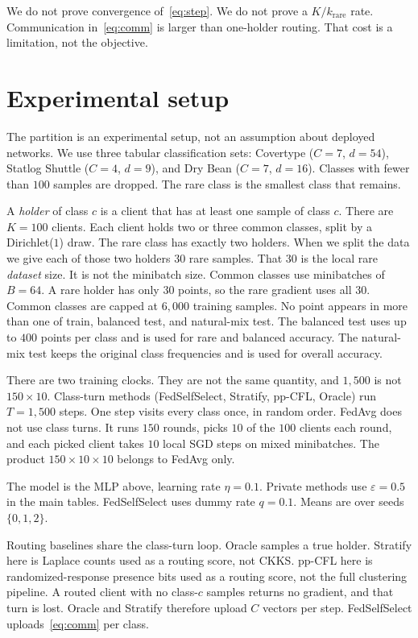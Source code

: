 \documentclass[11pt,a4paper]{article}
\theoremstyle{plain}
\begin{document}
We do not prove convergence of~\eqref{eq:step}. We do not prove a $K/k_{\mathrm{rare}}$ rate. Communication in~\eqref{eq:comm} is larger than one-holder routing. That cost is a limitation, not the objective.

\section{Experimental setup}

The partition is an experimental setup, not an assumption about deployed networks. We use three tabular classification sets: Covertype ($C{=}7$, $d{=}54$), Statlog Shuttle ($C{=}4$, $d{=}9$), and Dry Bean ($C{=}7$, $d{=}16$). Classes with fewer than $100$ samples are dropped. The rare class is the smallest class that remains.

A \emph{holder} of class $c$ is a client that has at least one sample of class $c$. There are $K{=}100$ clients. Each client holds two or three common classes, split by a Dirichlet($1$) draw. The rare class has exactly two holders. When we split the data we give each of those two holders $30$ rare samples. That $30$ is the local rare \emph{dataset} size. It is not the minibatch size. Common classes use minibatches of $B{=}64$. A rare holder has only $30$ points, so the rare gradient uses all $30$. Common classes are capped at $6{,}000$ training samples. No point appears in more than one of train, balanced test, and natural-mix test. The balanced test uses up to $400$ points per class and is used for rare and balanced accuracy. The natural-mix test keeps the original class frequencies and is used for overall accuracy.

There are two training clocks. They are not the same quantity, and $1{,}500$ is not $150\times 10$. Class-turn methods (FedSelfSelect, Stratify, pp-CFL, Oracle) run $T{=}1{,}500$ steps. One step visits every class once, in random order. FedAvg does not use class turns. It runs $150$ rounds, picks $10$ of the $100$ clients each round, and each picked client takes $10$ local SGD steps on mixed minibatches. The product $150\times 10\times 10$ belongs to FedAvg only.

The model is the MLP above, learning rate $\eta{=}0.1$. Private methods use $\varepsilon{=}0.5$ in the main tables. FedSelfSelect uses dummy rate $q{=}0.1$. Means are over seeds $\{0,1,2\}$.

Routing baselines share the class-turn loop. Oracle samples a true holder. Stratify here is Laplace counts used as a routing score, not CKKS. pp-CFL here is randomized-response presence bits used as a routing score, not the full clustering pipeline. A routed client with no class-$c$ samples returns no gradient, and that turn is lost. Oracle and Stratify therefore upload $C$ vectors per step. FedSelfSelect uploads~\eqref{eq:comm} per class.
\end{document}
